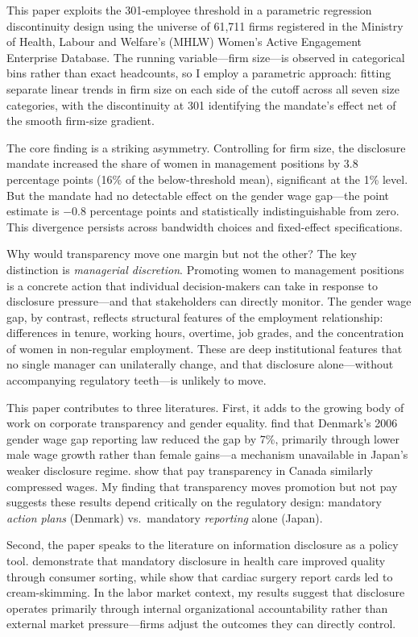 \documentclass[12pt]{article}
\begin{document}
This paper exploits the 301-employee threshold in a parametric regression discontinuity design using the universe of 61,711 firms registered in the Ministry of Health, Labour and Welfare's (MHLW) Women's Active Engagement Enterprise Database. The running variable---firm size---is observed in categorical bins rather than exact headcounts, so I employ a parametric approach: fitting separate linear trends in firm size on each side of the cutoff across all seven size categories, with the discontinuity at 301 identifying the mandate's effect net of the smooth firm-size gradient.

The core finding is a striking asymmetry. Controlling for firm size, the disclosure mandate increased the share of women in management positions by 3.8 percentage points (16\% of the below-threshold mean), significant at the 1\% level. But the mandate had no detectable effect on the gender wage gap---the point estimate is $-0.8$ percentage points and statistically indistinguishable from zero. This divergence persists across bandwidth choices and fixed-effect specifications.

Why would transparency move one margin but not the other? The key distinction is \textit{managerial discretion}. Promoting women to management positions is a concrete action that individual decision-makers can take in response to disclosure pressure---and that stakeholders can directly monitor. The gender wage gap, by contrast, reflects structural features of the employment relationship: differences in tenure, working hours, overtime, job grades, and the concentration of women in non-regular employment. These are deep institutional features that no single manager can unilaterally change, and that disclosure alone---without accompanying regulatory teeth---is unlikely to move.

This paper contributes to three literatures. First, it adds to the growing body of work on corporate transparency and gender equality. \citet{bennedsen2022} find that Denmark's 2006 gender wage gap reporting law reduced the gap by 7\%, primarily through lower male wage growth rather than female gains---a mechanism unavailable in Japan's weaker disclosure regime. \citet{baker2023} show that pay transparency in Canada similarly compressed wages. My finding that transparency moves promotion but not pay suggests these results depend critically on the regulatory design: mandatory \textit{action plans} (Denmark) vs.\ mandatory \textit{reporting} alone (Japan).

Second, the paper speaks to the literature on information disclosure as a policy tool. \citet{jin2003} demonstrate that mandatory disclosure in health care improved quality through consumer sorting, while \citet{dranove2003} show that cardiac surgery report cards led to cream-skimming. In the labor market context, my results suggest that disclosure operates primarily through internal organizational accountability rather than external market pressure---firms adjust the outcomes they can directly control.
\end{document}
